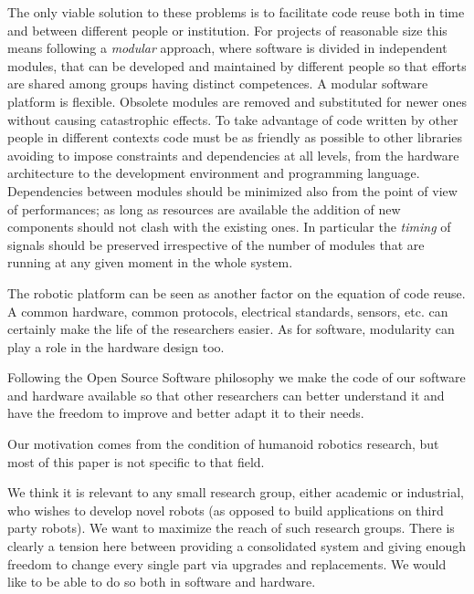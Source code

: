 The only viable solution to these problems is to facilitate 
code reuse both in time and between different people or 
institution. For projects of reasonable size this means following
a \emph{modular} approach, where software is divided in 
independent modules, that can be developed and maintained 
by different people so that efforts 
are shared among groups having distinct competences. A 
modular software platform is flexible. Obsolete modules are 
removed and substituted for newer ones without causing 
catastrophic effects. To take advantage of code written by 
other people in different contexts code must be as friendly 
as possible to other libraries avoiding to impose constraints 
and dependencies at all levels, from the hardware architecture 
to the development environment and programming language. 
Dependencies between modules should be 
minimized also from the point of view of performances; as 
long as resources are available the addition of new 
components should not clash with the existing ones. In 
particular the \emph{timing} of signals should be preserved 
irrespective of the number of modules that are running 
at any given moment in the whole system. 

%
The robotic platform can be seen as another factor on the
equation of code reuse. A common hardware, common protocols,
electrical standards, sensors, etc. can certainly make the 
life of the researchers easier. As for software, modularity 
can play a role in the hardware design too. 

Following the Open Source Software philosophy we make the 
code of our software and hardware available so that other 
researchers can better understand it and have the freedom 
to improve and better adapt it to their needs.

Our motivation comes from the condition of humanoid robotics 
research, but most of this paper is not specific to that field.

%
We think it is relevant to any small research group, either academic or
industrial, who wishes to develop novel robots (as opposed to 
build applications on third party robots).  We want to maximize the 
reach of such research groups. There is clearly a tension here 
between providing a consolidated system and giving enough freedom
to change every single part via upgrades and replacements. We would
like to be able to do so both in software and hardware.




